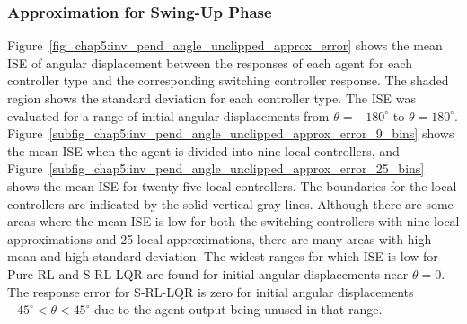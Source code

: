 \subsubsection{Approximation for Swing-Up Phase}

Figure~\ref{fig_chap5:inv_pend_angle_unclipped_approx_error} shows the mean ISE of angular displacement between the responses of each agent for each controller type and the corresponding switching controller response. The shaded region shows the standard deviation for each controller type. The ISE was evaluated for a range of initial angular displacements from $\theta=-180^\circ$ to $\theta = 180^\circ$.
%
Figure~\ref{subfig_chap5:inv_pend_angle_unclipped_approx_error_9_bins} shows the mean ISE when the agent is divided into nine local controllers, and Figure~\ref{subfig_chap5:inv_pend_angle_unclipped_approx_error_25_bins} shows the mean ISE for twenty-five local controllers. The boundaries for the local controllers are indicated by the solid vertical gray lines.
Although there are some areas where the mean ISE is low for both the switching controllers with nine local approximations and 25 local approximations, there are many areas with high mean and high standard deviation.
%
The widest ranges for which ISE is low for Pure RL and S-RL-LQR are found for initial angular displacements near $\theta=0$. The response error for S-RL-LQR is zero for initial angular displacements $-45^\circ<\theta<45^\circ$ due to the agent output being unused in that range.
%
%

